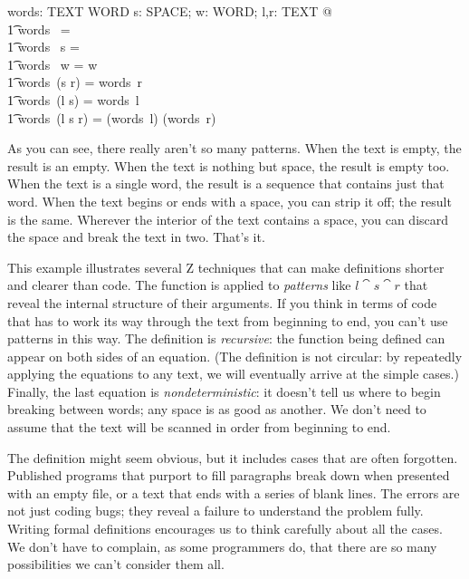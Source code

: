 \begin{axdef}
        words: TEXT \fun \seq WORD
\where 
        \forall s: SPACE; w: WORD; l,r: TEXT  @ \\
\t1		words~ \langle \rangle = \langle \rangle \land \\
\t1		words~ s = \langle \rangle \land \\
\t1		words~ w = \langle w \rangle \land \\
\t1		words~(s \cat r) = words~r \land \\
\t1		words~(l \cat s) = words~l \land \\
\t1		words~(l \cat s \cat r) = (words~l) \cat (words~r)
\end{axdef}
As you can see, there really aren't so many patterns. When the text is empty,
the result is an empty.  When the text is nothing but space, the
result is empty too.  When the text is a single word, the result is a
sequence that contains just that word.  When the text begins or ends with a
space, you can strip it off; the result is the same.  Wherever
the interior of the text contains a space, you can discard the space and 
break the text in two.   That's it.

This example illustrates several Z techniques that can make definitions
shorter and clearer than code.  The function is applied to {\em patterns}
like $l \cat s \cat r$ that reveal the internal structure of their arguments.
If you think in terms of code that has to work its way through the text from
beginning to end, you can't use patterns in this way.  The definition is
{\em recursive}: the function being defined can appear on both sides of an
equation.  (The definition is not circular: by repeatedly applying the
equations to any text, we will eventually arrive at the simple cases.)
Finally, the last equation is {\em nondeterministic}: it doesn't tell us
where to begin breaking between words; any space is as good as another.  We
don't need to assume that the text will be scanned in order from beginning
to end.

The definition might seem obvious, but it includes cases that are often
forgotten.  Published programs that purport to fill paragraphs break down
when presented with an empty file, or a text that ends with a series of
blank lines.  The errors are not just coding bugs; they reveal a failure to
understand the problem fully.  Writing formal definitions encourages us to 
think carefully about all the cases.  We don't have to complain, as some
programmers do, that there are so many possibilities we can't consider
them all.

